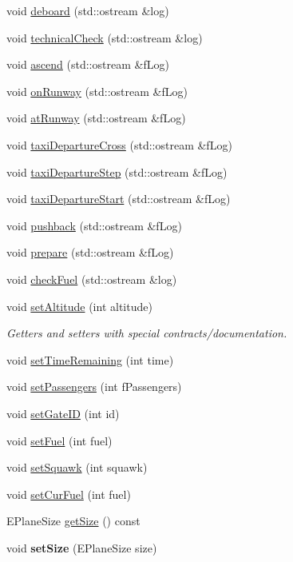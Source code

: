 \begin{DoxyCompactItemize}
\item 
void \hyperlink{classAirplane_ab321adcb22c349b2917416c33a052dfe}{deboard} (std\+::ostream \&log)
\item 
void \hyperlink{classAirplane_a15f4ddd77be6754ffd31e1c4f499e41c}{technical\+Check} (std\+::ostream \&log)
\item 
void \hyperlink{classAirplane_a7af6a3b907be25247455830265befd28}{ascend} (std\+::ostream \&f\+Log)
\item 
void \hyperlink{classAirplane_aee84fa3894dc1978bc78e307c3c628c4}{on\+Runway} (std\+::ostream \&f\+Log)
\item 
void \hyperlink{classAirplane_a2280da4f41ce62d63fe785d1935d4205}{at\+Runway} (std\+::ostream \&f\+Log)
\item 
void \hyperlink{classAirplane_ab7eaf297d958af5764755d76bd23177c}{taxi\+Departure\+Cross} (std\+::ostream \&f\+Log)
\item 
void \hyperlink{classAirplane_abaa6cc9cae3821e26731f0f0792b878e}{taxi\+Departure\+Step} (std\+::ostream \&f\+Log)
\item 
void \hyperlink{classAirplane_a96fabaa910b088a1173aa3706d2e4c42}{taxi\+Departure\+Start} (std\+::ostream \&f\+Log)
\item 
void \hyperlink{classAirplane_a0238712883456e7df2073f054dbe1347}{pushback} (std\+::ostream \&f\+Log)
\item 
void \hyperlink{classAirplane_ab3275ffc4b5e27f61180ed6f03fce0f3}{prepare} (std\+::ostream \&f\+Log)
\item 
void \hyperlink{classAirplane_aba3070261e49daba68be9fb4f7bbc6cd}{check\+Fuel} (std\+::ostream \&log)
\item 
void \hyperlink{classAirplane_a60ea276094957364060f7b22bb6e549d}{set\+Altitude} (int altitude)
\begin{DoxyCompactList}\small\item\em Getters and setters with special contracts/documentation. \end{DoxyCompactList}\item 
void \hyperlink{classAirplane_a43e7b856df001168956ed6d115943ec9}{set\+Time\+Remaining} (int time)
\item 
void \hyperlink{classAirplane_a1f8bcb214c96664d15d8c4d82c3f613a}{set\+Passengers} (int f\+Passengers)
\item 
void \hyperlink{classAirplane_aed585c73c9dd5065bd1f8b55236260a0}{set\+Gate\+ID} (int id)
\item 
void \hyperlink{classAirplane_a13aeed597173ecae5951cb9bdaf22474}{set\+Fuel} (int fuel)
\item 
void \hyperlink{classAirplane_ac9106f1b9f793b2a17bb605f514e0fcf}{set\+Squawk} (int squawk)
\item 
void \hyperlink{classAirplane_a4f15d7aaed74d4e001ef03aefb477afd}{set\+Cur\+Fuel} (int fuel)
\item 
E\+Plane\+Size \hyperlink{classAirplane_a0160009a553a9bf339892ba4c3803830}{get\+Size} () const 
\item 
void {\bfseries set\+Size} (E\+Plane\+Size size)\hypertarget{classAirplane_ab88c4d346a27430d4812f37c717c26d3}{}\label{classAirplane_ab88c4d346a27430d4812f37c717c26d3}


\end{DoxyCompactItemize}
